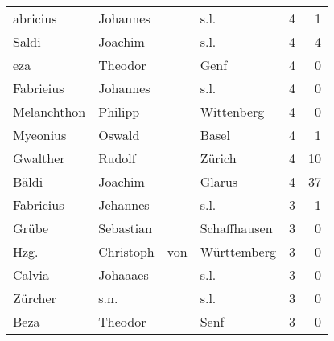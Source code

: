 \begin{tabular}{llllrr}
                 abricius &                           Johannes &             &                                        s.l. &          4 &         1 \\
                    Saldi &                            Joachim &             &                                        s.l. &          4 &         4 \\
                      eza &                            Theodor &             &                                        Genf &          4 &         0 \\
                Fabrieius &                           Johannes &             &                                        s.l. &          4 &         0 \\
              Melanchthon &                            Philipp &             &                                  Wittenberg &          4 &         0 \\
                 Myeonius &                             Oswald &             &                                       Basel &          4 &         1 \\
                 Gwalther &                             Rudolf &             &                                      Zürich &          4 &        10 \\
                    Bäldi &                            Joachim &             &                                      Glarus &          4 &        37 \\
                Fabricius &                           Jehannes &             &                                        s.l. &          3 &         1 \\
                    Grübe &                          Sebastian &             &                                Schaffhausen &          3 &         0 \\
                     Hzg. &                          Christoph &         von &                                 Württemberg &          3 &         0 \\
                   Calvia &                           Johaaaes &             &                                        s.l. &          3 &         0 \\
                  Zürcher &                               s.n. &             &                                        s.l. &          3 &         0 \\
                     Beza &                            Theodor &             &                                        Senf &          3 &         0 \\

\end{tabular}

